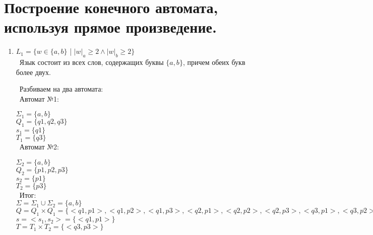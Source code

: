 \documentclass{article}
\begin{document}

\section{Построение конечного автомата, используя прямое произведение.}

\begin{enumerate}

\item {$L_1 = \{ w \in \{a,b\} $ | $ {|w|_a} \ge 2 \wedge {|w|_b} \ge 2 \}$}\\

\ Язык состоит из всех слов, содержащих буквы $\{a, b\}$, причем обеих букв более двух. 

\ Разбиваем на два автомата: \\

\ Автомат №1: \\


$ \Sigma_{1} = \{ a, b \}$ \\
$ Q_{1} = \{ q1, q2, q3 \} $ \\
$ s_{1} = \{ q1 \} $ \\
$ T_{1} = \{ q3 \}$ \\

\ Автомат №2: \\


$ \Sigma_{2} = \{ a, b \}$ \\
$ Q_{2} = \{ p1, p2, p3 \} $ \\
$ s_{2} = \{ p1 \} $ \\
$ T_{2} = \{ p3 \}$ \\

\ Итог: \\

$ \Sigma = \Sigma_{1} \cup \Sigma_{2} = \{ a, b \}$ \\
$ Q = Q_{1} \times Q_{1} = \{ <q1,p1>, <q1,p2>, <q1,p3>, <q2,p1>, <q2,p2>, <q2,p3>, <q3,p1>, <q3,p2>, <q3,p3> \}$ \\
$ s = <s_{1}, s_{2}> = \{ <q1,p1> \}$ \\
$ T = T_{1} \times T_{2} = \{ <q3,p3> \}$ \\


\end{enumerate}
\end{document}
